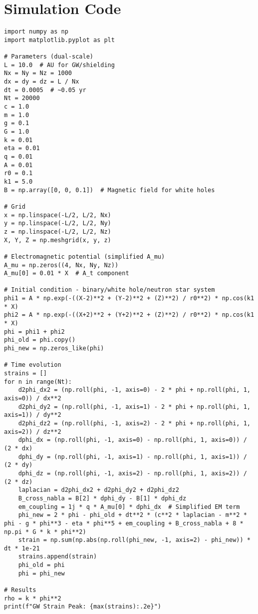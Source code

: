 \documentclass[11pt]{article}
\begin{document}
\section{Simulation Code}
\lstset{language=Python, basicstyle=\footnotesize\ttfamily, breaklines=true, numbers=left}
\begin{lstlisting}
import numpy as np
import matplotlib.pyplot as plt

# Parameters (dual-scale)
L = 10.0  # AU for GW/shielding
Nx = Ny = Nz = 1000
dx = dy = dz = L / Nx
dt = 0.0005  # ~0.05 yr
Nt = 20000
c = 1.0
m = 1.0
g = 0.1
G = 1.0
k = 0.01
eta = 0.01
q = 0.01
A = 0.01
r0 = 0.1
k1 = 5.0
B = np.array([0, 0, 0.1])  # Magnetic field for white holes

# Grid
x = np.linspace(-L/2, L/2, Nx)
y = np.linspace(-L/2, L/2, Ny)
z = np.linspace(-L/2, L/2, Nz)
X, Y, Z = np.meshgrid(x, y, z)

# Electromagnetic potential (simplified A_mu)
A_mu = np.zeros((4, Nx, Ny, Nz))
A_mu[0] = 0.01 * X  # A_t component

# Initial condition - binary/white hole/neutron star system
phi1 = A * np.exp(-((X-2)**2 + (Y-2)**2 + (Z)**2) / r0**2) * np.cos(k1 * X)
phi2 = A * np.exp(-((X+2)**2 + (Y+2)**2 + (Z)**2) / r0**2) * np.cos(k1 * X)
phi = phi1 + phi2
phi_old = phi.copy()
phi_new = np.zeros_like(phi)

# Time evolution
strains = []
for n in range(Nt):
    d2phi_dx2 = (np.roll(phi, -1, axis=0) - 2 * phi + np.roll(phi, 1, axis=0)) / dx**2
    d2phi_dy2 = (np.roll(phi, -1, axis=1) - 2 * phi + np.roll(phi, 1, axis=1)) / dy**2
    d2phi_dz2 = (np.roll(phi, -1, axis=2) - 2 * phi + np.roll(phi, 1, axis=2)) / dz**2
    dphi_dx = (np.roll(phi, -1, axis=0) - np.roll(phi, 1, axis=0)) / (2 * dx)
    dphi_dy = (np.roll(phi, -1, axis=1) - np.roll(phi, 1, axis=1)) / (2 * dy)
    dphi_dz = (np.roll(phi, -1, axis=2) - np.roll(phi, 1, axis=2)) / (2 * dz)
    laplacian = d2phi_dx2 + d2phi_dy2 + d2phi_dz2
    B_cross_nabla = B[2] * dphi_dy - B[1] * dphi_dz
    em_coupling = 1j * q * A_mu[0] * dphi_dx  # Simplified EM term
    phi_new = 2 * phi - phi_old + dt**2 * (c**2 * laplacian - m**2 * phi - g * phi**3 - eta * phi**5 + em_coupling + B_cross_nabla + 8 * np.pi * G * k * phi**2)
    strain = np.sum(np.abs(np.roll(phi_new, -1, axis=2) - phi_new)) * dt * 1e-21
    strains.append(strain)
    phi_old = phi
    phi = phi_new

# Results
rho = k * phi**2
print(f"GW Strain Peak: {max(strains):.2e}")
\end{lstlisting}
\end{document}
